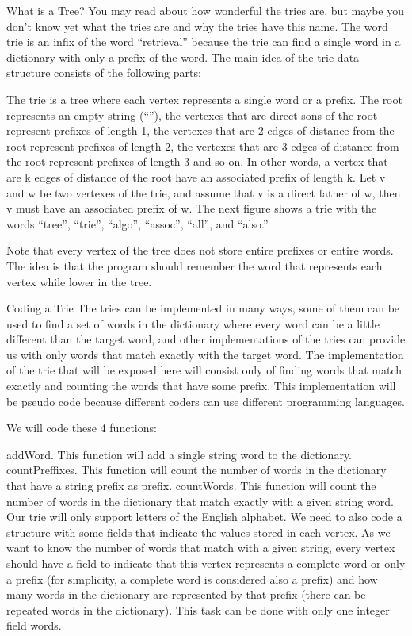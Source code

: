 What is a Tree?
You may read about how wonderful the tries are, but maybe you don’t know yet what the tries are and why the tries have this name. The word trie is an infix of the word “retrieval” because the trie can find a single word in a dictionary with only a prefix of the word. The main idea of the trie data structure consists of the following parts:

The trie is a tree where each vertex represents a single word or a prefix.
The root represents an empty string (“”), the vertexes that are direct sons of the root represent prefixes of length 1, the vertexes that are 2 edges of distance from the root represent prefixes of length 2, the vertexes that are 3 edges of distance from the root represent prefixes of length 3 and so on. In other words, a vertex that are k edges of distance of the root have an associated prefix of length k.
Let v and w be two vertexes of the trie, and assume that v is a direct father of w, then v must have an associated prefix of w.
The next figure shows a trie with the words “tree”, “trie”, “algo”, “assoc”, “all”, and “also.”


Note that every vertex of the tree does not store entire prefixes or entire words. The idea is that the program should remember the word that represents each vertex while lower in the tree.

Coding a Trie
The tries can be implemented in many ways, some of them can be used to find a set of words in the dictionary where every word can be a little different than the target word, and other implementations of the tries can provide us with only words that match exactly with the target word. The implementation of the trie that will be exposed here will consist only of finding words that match exactly and counting the words that have some prefix. This implementation will be pseudo code because different coders can use different programming languages.

We will code these 4 functions:

addWord. This function will add a single string word to the dictionary.
countPreffixes. This function will count the number of words in the dictionary that have a string prefix as prefix.
countWords. This function will count the number of words in the dictionary that match exactly with a given string word.
Our trie will only support letters of the English alphabet.
We need to also code a structure with some fields that indicate the values stored in each vertex. As we want to know the number of words that match with a given string, every vertex should have a field to indicate that this vertex represents a complete word or only a prefix (for simplicity, a complete word is considered also a prefix) and how many words in the dictionary are represented by that prefix (there can be repeated words in the dictionary). This task can be done with only one integer field words.

